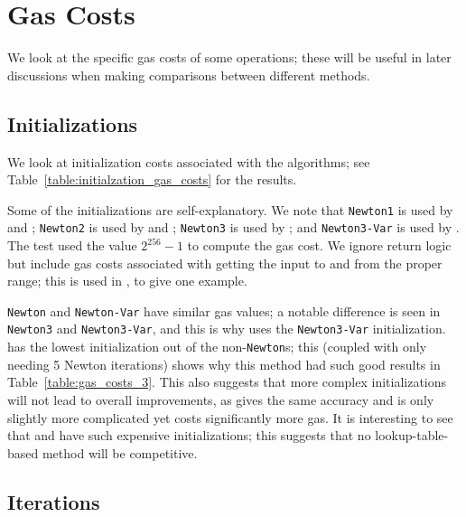 \section{Gas Costs}
\label{app:gas_costs}

We look at the specific gas costs of some operations;
these will be useful in later discussions when making comparisons
between different methods.

\subsection{Initializations}
\label{app_gas_costs:initializations}

We look at initialization costs associated with the algorithms;
see Table~\ref{table:initialzation_gas_costs} for the results.

Some of the initializations are self-explanatory.
We note that \texttt{Newton1} is used by \UnrolledOne{} and \WhileOne{};
\texttt{Newton2} is used by \UnrolledTwo{} and \WhileTwo{};
\texttt{Newton3} is used by \WhileThree{};
and \texttt{Newton3-Var} is used by \UnrolledThree{}.
The test used the value $2^{256}-1$ to compute the gas cost.
We ignore return logic but include gas costs associated
with getting the input to and from the proper range;
this is used in \Linear{}, to give one example.

\texttt{Newton} and \texttt{Newton-Var} have similar gas values;
a notable difference is seen in 
\texttt{Newton3} and \texttt{Newton3-Var},
and this is why \UnrolledThree{} uses the \texttt{Newton3-Var} initialization.
\Linear{} has the lowest initialization out of the non-\texttt{Newton}s;
this (coupled with only needing 5 Newton iterations)
shows why this method had such good results in Table~\ref{table:gas_costs_3}.
This also suggests that more complex initializations will
not lead to overall improvements,
as \HyperFour{} gives the same accuracy and is only slightly more complicated
yet costs significantly more gas.
It is interesting to see that \LookupFour{} and \LookupEight{}
have such expensive initializations;
this suggests that no lookup-table-based method will be competitive.



\subsection{Iterations}
\label{app_gas_costs:iterations}



